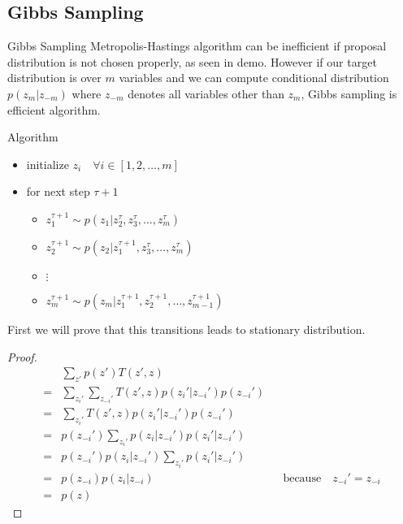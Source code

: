 \documentclass[pdf]{beamer}
\begin{document}
\subsection{Gibbs Sampling}
\begin{frame}{Gibbs Sampling}
  Metropolis-Hastings algorithm can be inefficient if proposal distribution is not chosen properly, as seen in demo. However if our target distribution is over $m$ variables and we can compute conditional distribution $p(z_m|z_{-m})$ where $z_{-m}$ denotes all variables other than $z_m$, Gibbs sampling is efficient algorithm.
  \pause

  \begin{block}{Algorithm}
    \begin{itemize}
    \item initialize $z_i \quad \forall i \in [1,2, \dots , m]$
    \item for next step $\tau + 1$
      \begin{itemize}
      \item $z_1^{\tau+1} \sim p(z_1 | z_2^\tau, z_3^\tau, \dots, z_m^\tau)$
      \item $z_2^{\tau+1} \sim p(z_2 | z_1^{\tau+1}, z_3^\tau, \dots, z_m^\tau)$

      \item[]{$\vdots$}

      \item $z_m^{\tau+1} \sim p(z_m | z_1^{\tau+1}, z_2^{\tau+1}, \dots, z_{m-1}^{\tau+1})$
      \end{itemize}
    \end{itemize}
  \end{block}
\end{frame}

\begin{frame}
  First we will prove that this transitions leads to stationary distribution.

  \begin{proof}
    \begin{align*}
      &  \sum_{z'}p(z') T(z', z) \\
      =& \sum_{z_i'}  \sum_{z_{-i}'} T(z', z) p(z_i'|z_{-i}') p(z_{-i}')  \\
      =& \sum_{z_i'}  T(z', z) p(z_i'|z_{-i}') p(z_{-i}') \\
      =&  p(z_{-i}') \sum_{z_i'}  p(z_i|z_{-i}') p(z_i'|z_{-i}') \\
      =&  p(z_{-i}')  p(z_i|z_{-i}') \sum_{z_i'}  p(z_i'|z_{-i}') \\
      =&  p(z_{-i})  p(z_i|z_{-i})  && \text{because} \quad z_{-i}' = z_{-i} \\
      =& p(z)
    \end{align*}
  \end{proof}
\end{frame}
\end{document}
